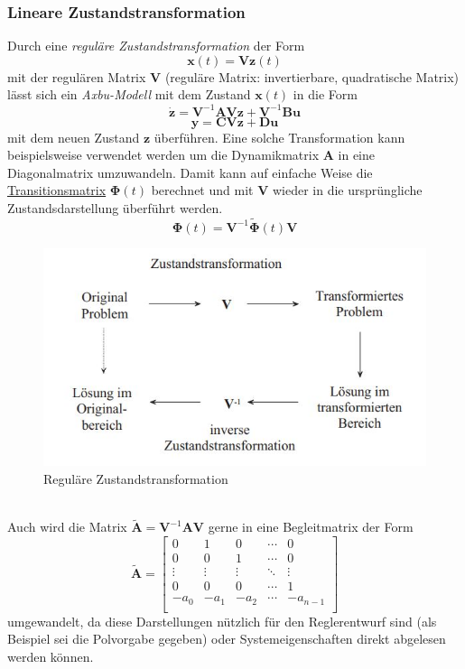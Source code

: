 		\subsubsection{Lineare Zustandstransformation}
			Durch eine \textit{reguläre Zustandstransformation} der Form
			\[\bm{x}(t) = \bm{Vz}(t)  \]
			mit der regulären Matrix $ \bm{V} $ (reguläre Matrix: invertierbare, quadratische Matrix) lässt sich ein \textit{Axbu-Modell} mit dem Zustand $ \bm{x}(t) $ in die Form
			\[\bm{\dot{z}} = \bm{V}^{-1}\bm{AVz} + \bm{V}^{-1}\bm{Bu} \]
			\[\bm{y} = \bm{CVz} + \bm{Du} \]
			mit dem neuen Zustand $ \bm{z} $ überführen. Eine solche Transformation kann beispielsweise verwendet werden um die Dynamikmatrix $ \bm{A} $ in eine Diagonalmatrix umzuwandeln. Damit kann auf einfache Weise die \hyperref[transitionsmatrix]{Transitionsmatrix} $ \bm{\Phi}(t) $ berechnet und mit $ \bm{V} $ wieder in die ursprüngliche Zustandsdarstellung überführt werden.
			\[ \bm{\Phi}(t) = \bm{V}^{-1}\tilde{\bm{\Phi}}(t)\bm{V} \] 
			\begin{figure}[h]
				\centering
				\includegraphics[width=0.4\linewidth]{./pics/re/zsttrans}
				\caption{Reguläre Zustandstransformation}
			\end{figure}
			\leavevmode \\
			Auch wird die Matrix $ \tilde{\bm{A}}= \bm{V}^{-1}\bm{AV}$ gerne in eine Begleitmatrix der Form
			\[ \tilde{\bm{A}} = \begin{bmatrix}0 & 1 & 0 & \dotsm & 0 \\
			0 & 0 & 1 & \dotsm & 0 \\
			\vdots & \vdots & \vdots & \ddots & \vdots\\
			0 & 0 & 0 & \dotsm & 1 \\
			-a_{0} & -a_{1} & -a_{2} & \dotsm & -a_{n-1} \\\end{bmatrix}\]
			umgewandelt, da diese Darstellungen nützlich für den Reglerentwurf sind (als Beispiel sei die Polvorgabe gegeben) oder Systemeigenschaften direkt abgelesen werden können.
			
